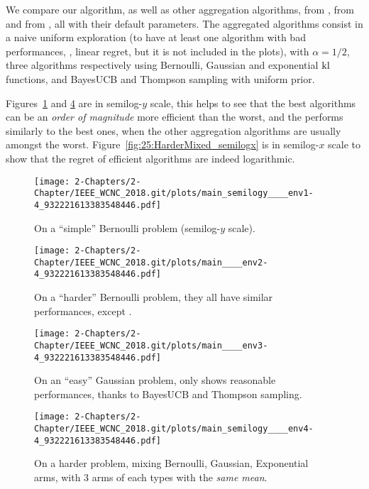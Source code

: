 We compare our \Aggr{} algorithm,
as well as other aggregation algorithms, \ExpQ{} from \cite{Bubeck12},
\CORRAL{} from \cite{Agarwal16} and \LearnExp{} from \cite{Singla17}, all with their default parameters.
%
The aggregated algorithms consist in a naive uniform exploration (to have at least one algorithm with bad performances, \ie, linear regret, but it is not included in the plots),
\UCB{} with $\alpha=1/2$, three \klUCB{} algorithms respectively using Bernoulli, Gaussian and exponential $\mathrm{kl}$ functions, and BayesUCB and Thompson sampling with uniform prior.

Figures~\ref{fig:25:EasyBernoulli} and \ref{fig:25:HarderMixed} are in semilog-$y$ scale, this helps to see that the best algorithms can be an \emph{order of magnitude} more efficient than the worst, and the \Aggr{} performs similarly to the best ones, when the other aggregation algorithms are usually amongst the worst.
Figure~\ref{fig:25:HarderMixed_semilogx} is in semilog-$x$ scale to show that the regret of efficient algorithms are indeed logarithmic.


\begin{figure}[h!]  %
	\centering
	\texttt{[image: 2-Chapters/2-Chapter/IEEE\_WCNC\_2018.git/plots/main\_semilogy\_\_\_\_env1-4\_932221613383548446.pdf]}
	\caption{On a ``simple'' Bernoulli problem (semilog-$y$ scale).}
	\label{fig:25:EasyBernoulli}
\end{figure}

\begin{figure}[b!]  %
	\centering
	\texttt{[image: 2-Chapters/2-Chapter/IEEE\_WCNC\_2018.git/plots/main\_\_\_\_env2-4\_932221613383548446.pdf]}
	\caption{On a ``harder'' Bernoulli problem, they all have similar performances, except \LearnExp.}
	\label{fig:25:HardBernoulli}
\end{figure}

\begin{figure}[b!]  %
	\centering
	\texttt{[image: 2-Chapters/2-Chapter/IEEE\_WCNC\_2018.git/plots/main\_\_\_\_env3-4\_932221613383548446.pdf]}
	\caption{On an ``easy'' Gaussian problem, only \Aggr{} shows reasonable performances, thanks to BayesUCB and Thompson sampling.}
	\label{fig:25:EasyGaussian}
\end{figure}

\begin{figure}[h!]  %
	\centering
	\texttt{[image: 2-Chapters/2-Chapter/IEEE\_WCNC\_2018.git/plots/main\_semilogy\_\_\_\_env4-4\_932221613383548446.pdf]}
	\caption{On a harder problem, mixing Bernoulli, Gaussian, Exponential arms, with 3 arms of each types with the \emph{same mean}.}
	\label{fig:25:HarderMixed}
\end{figure}

